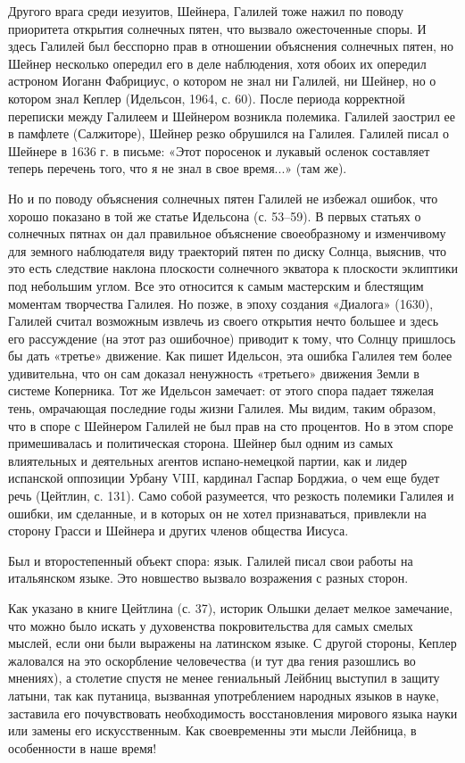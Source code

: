 Другого врага  среди иезуитов, Шейнера,  Галилей тоже нажил  по поводу
приоритета открытия солнечных пятен, что вызвало ожесточенные споры. И
здесь  Галилей был  бесспорно  прав в  отношении объяснения  солнечных
пятен, но Шейнер несколько опередил  его в деле наблюдения, хотя обоих
их опередил астроном  Иоганн Фабрициус, о котором не  знал ни Галилей,
ни Шейнер,  но о котором  знал Кеплер  (Идельсон, 1964, с.  60). После
периода  корректной  переписки  между  Галилеем  и  Шейнером  возникла
полемика.  Галилей заострил  ее в  памфлете (Салжиторе),  Шейнер резко
обрушился на  Галилея. Галилей  писал о  Шейнере в  1636 г.  в письме:
«Этот поросенок и лукавый осленок составляет теперь перечень того, что
я не знал в свое время...» (там же).

Но и по  поводу объяснения солнечных пятен Галилей  не избежал ошибок,
что хорошо  показано в той же  статье Идельсона (с. 53--59).  В первых
статьях о солнечных пятнах  он дал правильное объяснение своеобразному
и изменчивому для  земного наблюдателя виду траекторий  пятен по диску
Солнца, выяснив,  что это есть следствие  наклона плоскости солнечного
экватора к плоскости эклиптики под  небольшим углом. Все это относится
к  самым  мастерским  и  блестящим  моментам  творчества  Галилея.  Но
позже,  в эпоху  создания «Диалога»  (1630), Галилей  считал возможным
извлечь из своего  открытия нечто большее и здесь  его рассуждение (на
этот  раз ошибочное)  приводит к  тому,  что Солнцу  пришлось бы  дать
«третье» движение.  Как пишет Идельсон,  эта ошибка Галилея  тем более
удивительна, что он сам доказал ненужность «третьего» движения Земли в
системе Коперника.  Тот же  Идельсон замечает:  от этого  спора падает
тяжелая тень, омрачающая последние годы жизни Галилея. Мы видим, таким
образом, что в споре с Шейнером  Галилей не был прав на сто процентов.
Но в этом споре примешивалась и политическая сторона. Шейнер был одним
из самых влиятельных и  деятельных агентов испано-немецкой партии, как
и лидер  испанской оппозиции Урбану  VIII, кардинал Гаспар  Борджиа, о
чем  еще будет  речь (Цейтлин,  с.  131). Само  собой разумеется,  что
резкость полемики  Галилея и ошибки, им  сделанные, и в которых  он не
хотел признаваться,  привлекли на  сторону Грасси  и Шейнера  и других
членов общества Иисуса.

Был и второстепенный объект спора:  язык. Галилей писал свои работы на
итальянском языке. Это новшество вызвало возражения с разных сторон.

Как указано  в книге  Цейтлина (с. 37),  историк Ольшки  делает мелкое
замечание,  что можно  было искать  у духовенства  покровительства для
самых  смелых мыслей,  если они  были выражены  на латинском  языке. С
другой стороны,  Кеплер жаловался  на это оскорбление  человечества (и
тут  два гения  разошлись  во  мнениях), а  столетие  спустя не  менее
гениальный  Лейбниц  выступил  в  защиту  латыни,  так  как  путаница,
вызванная  употреблением  народных  языков   в  науке,  заставила  его
почувствовать  необходимость восстановления  мирового языка  науки или
замены  его  искусственным. Как  своевременны  эти  мысли Лейбница,  в
особенности в наше время!

